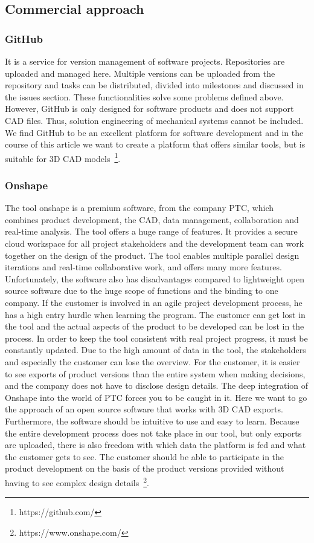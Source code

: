     \subsection*{Commercial approach}
    \subsubsection*{GitHub}
    It is a service for version management of software projects. Repositories are uploaded and managed here. Multiple versions can be uploaded from the repository and tasks can be distributed, divided into milestones and discussed in the issues section. These functionalities solve some problems defined above. However, GitHub is only designed for software products and does not support CAD files. Thus, solution engineering of mechanical systems cannot be included. We find GitHub to be an excellent platform for software development and in the course of this article we want to create a platform that offers similar tools, but is suitable for 3D CAD models~\footnote{https://github.com/}.

    \subsubsection*{Onshape}
    The tool onshape is a premium software, from the company PTC, which combines product development, the CAD, data management, collaboration and real-time analysis. The tool offers a huge range of features. It provides a secure cloud workspace for all project stakeholders and the development team can work together on the design of the product. The tool enables multiple parallel design iterations and real-time collaborative work, and offers many more features. 
    Unfortunately, the software also has disadvantages compared to lightweight open source software due to the huge scope of functions and the binding to one company. If the customer is involved in an agile project development process, he has a high entry hurdle when learning the program. The customer can get lost in the tool and the actual aspects of the product to be developed can be lost in the process. In order to keep the tool consistent with real project progress, it must be constantly updated. Due to the high amount of data in the tool, the stakeholders and especially the customer can lose the overview. For the customer, it is easier to see exports of product versions than the entire system when making decisions, and the company does not have to disclose design details. The deep integration of Onshape into the world of PTC forces you to be caught in it. 
    Here we want to go the approach of an open source software that works with 3D CAD exports. Furthermore, the software should be intuitive to use and easy to learn. Because the entire development process does not take place in our tool, but only exports are uploaded, there is also freedom with which data the platform is fed and what the customer gets to see. The customer should be able to participate in the product development on the basis of the product versions provided without having to see complex design details~\footnote{https://www.onshape.com/}.

